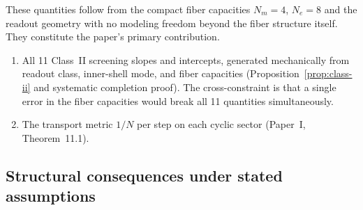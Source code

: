\documentclass[11pt,a4paper]{article}
\begin{document}
These quantities follow from the compact fiber capacities $N_m = 4$, $N_e = 8$ and the readout geometry with no modeling freedom beyond the fiber structure itself. They constitute the paper's primary contribution.
\begin{enumerate}
\item All 11 Class~II screening slopes and intercepts, generated mechanically from readout class, inner-shell mode, and fiber capacities (Proposition~\ref{prop:class-ii} and systematic completion proof). The cross-constraint is that a single error in the fiber capacities would break all 11 quantities simultaneously.
\item The transport metric $1/N$ per step on each cyclic sector (Paper~I, Theorem~11.1).
\end{enumerate}

\subsection{Structural consequences under stated assumptions}
\end{document}
